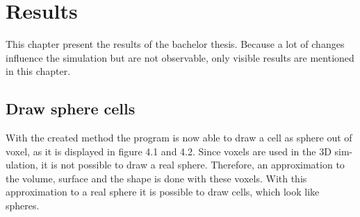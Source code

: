 \chapter{Results}
This chapter present the results of the bachelor thesis. Because a lot of changes
influence the simulation but are not observable, only visible results are mentioned
in this chapter.

\section{Draw sphere cells}
With the created method the program is now able to draw a cell as sphere out of
voxel, as it is displayed in figure 4.1 and 4.2. Since voxels are used in the 3D sim-
ulation, it is not possible to draw a real sphere. Therefore, an approximation to the
volume, surface and the shape is done with these voxels. With this approximation
to a real sphere it is possible to draw cells, which look like spheres.

